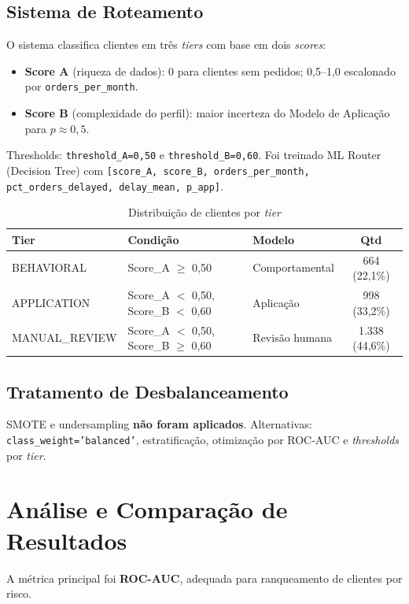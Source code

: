 \documentclass[conference]{IEEEtran}
\newcommand{\code}[1]{\texttt{#1}}
\begin{document}
\subsection{Sistema de Roteamento}

O sistema classifica clientes em três \textit{tiers} com base em dois \textit{scores}:
\begin{itemize}
    \item \textbf{Score A} (riqueza de dados): 0 para clientes sem pedidos; 0,5--1,0 escalonado por \code{orders\_per\_month}.
    \item \textbf{Score B} (complexidade do perfil): maior incerteza do Modelo de Aplicação para $p \approx 0{,}5$.
\end{itemize}
Thresholds: \code{threshold\_A=0,50} e \code{threshold\_B=0,60}. Foi treinado ML Router (Decision Tree) com \code{[score\_A, score\_B, orders\_per\_month, pct\_orders\_delayed, delay\_mean, p\_app]}.

\begin{table}[!t]
\caption{Distribuição de clientes por \textit{tier}}
\label{tab:tiers}
\centering
\small
\begin{tabular}{lllc}
\toprule
\textbf{Tier} & \textbf{Condição} & \textbf{Modelo} & \textbf{Qtd} \\
\midrule
BEHAVIORAL & Score\_A $\geq$ 0,50 & Comportamental & 664 (22,1\%) \\
APPLICATION & Score\_A $<$ 0,50, Score\_B $<$ 0,60 & Aplicação & 998 (33,2\%) \\
MANUAL\_REVIEW & Score\_A $<$ 0,50, Score\_B $\geq$ 0,60 & Revisão humana & 1.338 (44,6\%) \\
\bottomrule
\end{tabular}
\end{table}

\subsection{Tratamento de Desbalanceamento}

SMOTE e undersampling \textbf{não foram aplicados}. Alternativas: \code{class\_weight='balanced'}, estratificação, otimização por ROC-AUC e \textit{thresholds} por \textit{tier}.

\section{Análise e Comparação de Resultados}

A métrica principal foi \textbf{ROC-AUC}, adequada para ranqueamento de clientes por risco.
\end{document}
